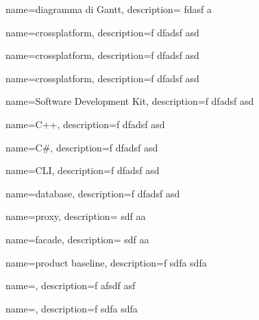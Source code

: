 {
  name=diagramma di Gantt,
  description={ fdasf a}
}

{
  name=crossplatform,
  description={f dfadsf asd }
}

{
  name=crossplatform,
  description={f dfadsf asd }
}

{
  name=crossplatform,
  description={f dfadsf asd }
}

{
  name=Software Development Kit,
  description={f dfadsf asd }
}


{
  name=C++,
  description={f dfadsf asd }
}

{
  name=C\#,
  description={f dfadsf asd }
}

{
  name=CLI,
  description={f dfadsf asd }
}

{
  name=database,
  description={f dfadsf asd }
}

{
  name={proxy},
  description={ sdf aa }
}

{
  name={facade},
  description={ sdf aa }
}

{
  name={product baseline},
  description={f  sdfa sdfa}
}

{
  name=,
  description={f afsdf asf }
}

{
  name=,
  description={f  sdfa sdfa}
}